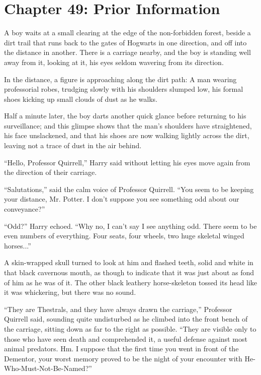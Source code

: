 \chapter{Chapter 49: Prior Information}
A boy waits at a small clearing at the edge of the non-forbidden forest,
beside a dirt trail that runs back to the gates of Hogwarts in one
direction, and off into the distance in another. There is a carriage
nearby, and the boy is standing well away from it, looking at it, his
eyes seldom wavering from its direction.

In the distance, a figure is approaching along the dirt path: A man
wearing professorial robes, trudging slowly with his shoulders slumped
low, his formal shoes kicking up small clouds of dust as he walks.

Half a minute later, the boy darts another quick glance before returning
to his surveillance; and this glimpse shows that the man's shoulders
have straightened, his face unslackened, and that his shoes are now
walking lightly across the dirt, leaving not a trace of dust in the air
behind.

``Hello, Professor Quirrell,'' Harry said without letting his eyes move
again from the direction of their carriage.

``Salutations,'' said the calm voice of Professor Quirrell. ``You seem
to be keeping your distance, Mr. Potter. I don't suppose you see
something odd about our conveyance?''

``Odd?'' Harry echoed. ``Why no, I can't say I see anything odd. There
seem to be even numbers of everything. Four seats, four wheels, two huge
skeletal winged horses...''

A skin-wrapped skull turned to look at him and flashed teeth, solid and
white in that black cavernous mouth, as though to indicate that it was
just about as fond of him as he was of it. The other black leathery
horse-skeleton tossed its head like it was whickering, but there was no
sound.

``They are Thestrals, and they have always drawn the carriage,''
Professor Quirrell said, sounding quite undisturbed as he climbed into
the front bench of the carriage, sitting down as far to the right as
possible. ``They are visible only to those who have seen death and
comprehended it, a useful defense against most animal predators. Hm. I
suppose that the first time you went in front of the Dementor, your
worst memory proved to be the night of your encounter with
He-Who-Must-Not-Be-Named?''

